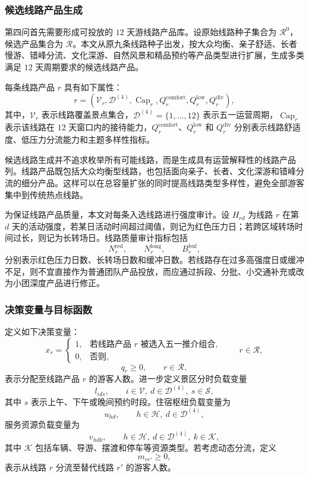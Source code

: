 \documentclass[UTF8,zihao=-4,a4paper]{ctexart}
\begin{document}
\subsubsection{候选线路产品生成}
\label{subsubsec:q4_route_generation}

第四问首先需要形成可投放的 $12$ 天游线路产品库。设原始线路种子集合为 $\mathcal{R}^{0}$，候选产品集合为 $\mathcal{R}$。本文从原九条线路种子出发，按大众均衡、亲子舒适、长者慢游、错峰分流、文化深游、自然风景和精品预约等产品类型进行扩展，生成多类满足 $12$ 天周期要求的候选线路产品。

每条线路产品 $r$ 具有如下属性：
\[
r=
(\mathcal{V}_r,\mathcal{D}^{(4)},\operatorname{Cap}_r,
Q_r^{\mathrm{comfort}},
Q_r^{\mathrm{low}},
Q_r^{\mathrm{div}}),
\]
其中，$\mathcal{V}_r$ 表示线路覆盖景点集合，$\mathcal{D}^{(4)}=\{1,\ldots,12\}$ 表示五一运营周期，$\operatorname{Cap}_r$ 表示该线路在 $12$ 天窗口内的接待能力，$Q_r^{\mathrm{comfort}}$、$Q_r^{\mathrm{low}}$ 和 $Q_r^{\mathrm{div}}$ 分别表示线路舒适度、低压力分流能力和主题多样性指标。

候选线路生成并不追求枚举所有可能线路，而是生成具有运营解释性的线路产品列。线路产品既包括大众均衡型线路，也包括面向亲子、长者、文化深游和错峰分流的细分产品。这样可以在总容量扩张的同时提高线路类型多样性，避免全部游客集中到传统热点线路。

为保证线路产品质量，本文对每条入选线路进行强度审计。设 $H_{rd}$ 为线路 $r$ 在第 $d$ 天的活动强度，若某日活动时间超过阈值，则记为红色压力日；若跨区域转场时间过长，则记为长转场日。线路质量审计指标包括
\[
N_r^{\mathrm{red}},
\qquad
N_r^{\mathrm{long}},
\qquad
B_r^{\mathrm{buf}},
\]
分别表示红色压力日数、长转场日数和缓冲日数。若线路存在过多高强度日或缓冲不足，则不宜直接作为普通团队产品投放，而应通过拆段、分批、小交通补充或改为小团深度产品进行修正。

\subsubsection{决策变量与目标函数}
\label{subsubsec:q4_variables_objective}

定义如下决策变量：
\[
x_r=
\begin{cases}
1, & \text{若线路产品 } r \text{ 被选入五一推介组合},\\
0, & \text{否则},
\end{cases}
\qquad r\in\mathcal{R},
\]
\[
q_r\geq 0,
\qquad r\in\mathcal{R},
\]
表示分配至线路产品 $r$ 的游客人数。进一步定义景区分时负载变量
\[
l_{ids},
\qquad i\in\mathcal{V},\ d\in\mathcal{D}^{(4)},\ s\in\mathcal{S},
\]
其中 $s$ 表示上午、下午或晚间预约时段。住宿枢纽负载变量为
\[
u_{hd},
\qquad h\in\mathcal{H},\ d\in\mathcal{D}^{(4)},
\]
服务资源负载变量为
\[
v_{hdk},
\qquad h\in\mathcal{H},\ d\in\mathcal{D}^{(4)},\ k\in\mathcal{K},
\]
其中 $\mathcal{K}$ 包括车辆、导游、摆渡和停车等资源类型。若考虑动态分流，定义
\[
m_{rr'}\geq 0,
\]
表示从线路 $r$ 分流至替代线路 $r'$ 的游客人数。
\end{document}
